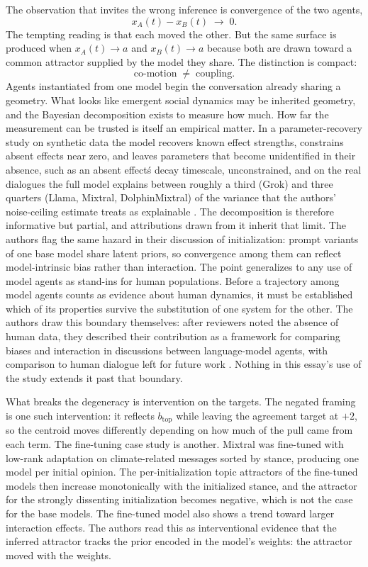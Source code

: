 \documentclass[11pt]{article}
\theoremstyle{definition}
\theoremstyle{remark}
\begin{document}
The observation that invites the wrong inference is convergence of the two agents,
\begin{equation}
x_A(t) - x_B(t) \;\longrightarrow\; 0 .
\end{equation}
The tempting reading is that each moved the other. But the same surface is produced when $x_A(t) \to a$ and $x_B(t) \to a$ because both are drawn toward a common attractor supplied by the model they share. The distinction is compact:
\begin{equation}
\text{co-motion} \;\neq\; \text{coupling}.
\end{equation}
Agents instantiated from one model begin the conversation already sharing a geometry. What looks like emergent social dynamics may be inherited geometry, and the Bayesian decomposition exists to measure how much. How far the measurement can be trusted is itself an empirical matter. In a parameter-recovery study on synthetic data the model recovers known effect strengths, constrains absent effects near zero, and leaves parameters that become unidentified in their absence, such as an absent effect\'s decay timescale, unconstrained, and on the real dialogues the full model explains between roughly a third (Grok) and three quarters (Llama, Mixtral, DolphinMixtral) of the variance that the authors' noise-ceiling estimate treats as explainable \cite{brockers2026}. The decomposition is therefore informative but partial, and attributions drawn from it inherit that limit. The authors flag the same hazard in their discussion of initialization: prompt variants of one base model share latent priors, so convergence among them can reflect model-intrinsic bias rather than interaction. The point generalizes to any use of model agents as stand-ins for human populations. Before a trajectory among model agents counts as evidence about human dynamics, it must be established which of its properties survive the substitution of one system for the other. The authors draw this boundary themselves: after reviewers noted the absence of human data, they described their contribution as a framework for comparing biases and interaction in discussions between language-model agents, with comparison to human dialogue left for future work \cite{brockers2026peer}. Nothing in this essay's use of the study extends it past that boundary.

What breaks the degeneracy is intervention on the targets. The negated framing is one such intervention: it reflects $b_{\mathrm{top}}$ while leaving the agreement target at $+2$, so the centroid moves differently depending on how much of the pull came from each term. The fine-tuning case study is another. Mixtral was fine-tuned with low-rank adaptation on climate-related messages sorted by stance, producing one model per initial opinion. The per-initialization topic attractors of the fine-tuned models then increase monotonically with the initialized stance, and the attractor for the strongly dissenting initialization becomes negative, which is not the case for the base models. The fine-tuned model also shows a trend toward larger interaction effects. The authors read this as interventional evidence that the inferred attractor tracks the prior encoded in the model's weights: the attractor moved with the weights.
\end{document}
